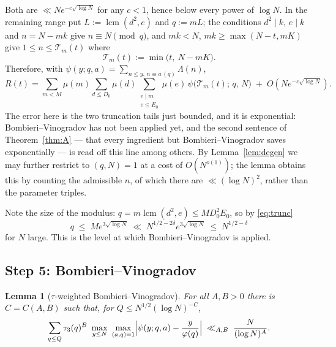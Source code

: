 \documentclass[11pt,a4paper]{article}
\theoremstyle{plain}
\newtheorem{lemma}[theorem]{Lemma}
\theoremstyle{definition}
\theoremstyle{remark}
\newcommand{\Tcut}{\mathcal T}
\DeclareMathOperator{\lcm}{lcm}
\begin{document}
Both are $\ll Ne^{-c\sqrt{\log N}}$ for any $c<1$, hence below every
power of $\log N$. In the remaining range put
$L:=\lcm(d^2,e)$ and $q:=mL$; the conditions $d^2\mid k$, $e\mid k$
and $n=N-mk$ give $n\equiv N\pmod q$, and $mk<N$,
$mk\ge\max(N-t,mK)$ give $1\le n\le\Tcut_m(t)$ where
\begin{equation}\label{eq:Tm}
  \Tcut_m(t):=\min\bigl(t,\ N-mK\bigr).
\end{equation}
Therefore, with $\psi(y;q,a)=\sum_{n\le y,\,n\equiv a\,(q)}\Lambda(n)$,
\begin{equation}\label{eq:R2}
  R(t)=\sum_{m<M}\mu(m)\sum_{d\le D_0}\mu(d)
         \sum_{\substack{e\mid m\\ e\le E_0}}\mu(e)\,
         \psi\bigl(\Tcut_m(t);\,q,\,N\bigr)
         \;+\;O\!\left(Ne^{-c\sqrt{\log N}}\right).
\end{equation}
The error here is the two truncation tails just bounded, and it is
exponential: Bombieri--Vinogradov has not been applied yet, and the
second sentence of Theorem~\ref{thm:A} --- that every ingredient but
Bombieri--Vinogradov saves exponentially --- is read off this line
among others.
By Lemma~\ref{lem:degen} we may further restrict to $(q,N)=1$ at a cost
of $O(N^{o(1)})$; the lemma obtains this by counting the admissible $n$,
of which there are $\ll(\log N)^2$, rather than the parameter triples.



Note the size of the modulus: $q=m\lcm(d^2,e)\le MD_0^2E_0$, so by
\eqref{eq:trunc}
\begin{equation}\label{eq:level}
  q\;\le\;M e^{3\sqrt{\log N}}
  \;\ll\;N^{1/2-2\delta}e^{3\sqrt{\log N}}
  \;\le\;N^{1/2-\delta}
\end{equation}
for $N$ large. This is the level at which Bombieri--Vinogradov is
applied.

\subsection{Step 5: Bombieri--Vinogradov}

\begin{lemma}[$\tau$-weighted Bombieri--Vinogradov]\label{lem:BV}
For all $A,B>0$ there is $C=C(A,B)$ such that, for
$Q\le N^{1/2}(\log N)^{-C}$,
\[
  \sum_{q\le Q}\tau_3(q)^{B}\ \max_{y\le N}\ \max_{(a,q)=1}
  \Bigl|\psi(y;q,a)-\frac{y}{\varphi(q)}\Bigr|
  \;\ll_{A,B}\;\frac{N}{(\log N)^{A}}.
\]
\end{lemma}
\end{document}

